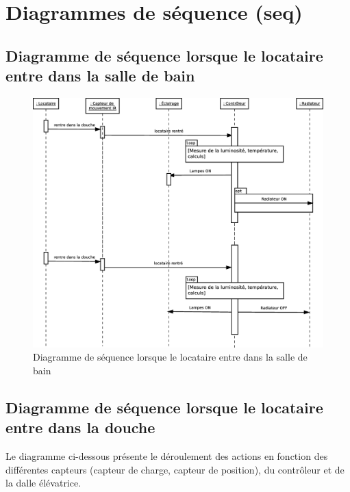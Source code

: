 \chapter{Diagrammes de séquence (seq)}
\section{Diagramme de séquence lorsque le locataire entre dans la salle de bain}
\begin{figure}[H]
	\centering
	\includegraphics[width=1\linewidth]{diagrams/bathroom/diagramme_sequence.eps}
	\caption{Diagramme de séquence lorsque le locataire entre dans la salle de bain}
	\label{fig:diagramme_seq1}
\end{figure}

\section{Diagramme de séquence lorsque le locataire entre dans la douche}
Le diagramme ci-dessous présente le déroulement des actions en fonction des différentes capteurs (capteur de charge, capteur de position), du contrôleur et de la dalle élévatrice. 

